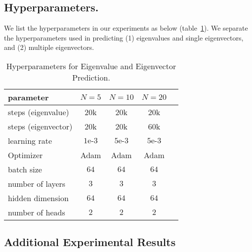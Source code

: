 




\subsection{Hyperparameters.}
We list the hyperparameters in our experiments as below (table~\ref{table:data-param}).
We separate the hyperparameters used in predicting (1) eigenvalues and single eigenvectors, and (2) multiple eigenvectors.

\begin{table}[h]
        \centering
        \caption{Hyperparameters for Eigenvalue and Eigenvector Prediction.
        }
        \begin{tabular}{l*{4}{c}}
        \toprule
            \bf{parameter} & $N=5$ & $N=10$  & $N=20$ \\ 
            \midrule
             steps (eigenvalue) & 20k & 20k & 20k \\
             steps (eigenvector) & 20k & 20k & 60k \\
            learning rate  & $1\text{e-}3$ & $5\text{e-}3$ & $5\text{e-}3$ \\
            Optimizer  & Adam & Adam & Adam \\
            batch size  & $64$ & $64$ & $64$  \\
            number of layers & $3$ & $3$ & $3$  \\
            hidden dimension & $64$ & $64$& $64$ \\
            number of heads  & $2$ & $2$& $2$ \\
            \bottomrule
        \end{tabular}
        \label{table:data-param}
    \end{table} 


\subsection{Additional Experimental Results}\label{sec:add_exp}

